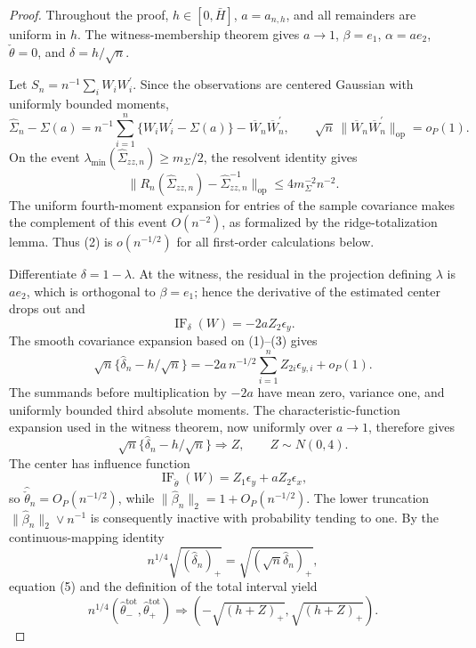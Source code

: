 \documentclass{article}
\begin{document}
\begin{proof}
Throughout the proof, \(h\in[0,\bar H]\), \(a=a_{n,h}\), and all remainders are uniform in \(h\). The witness-membership theorem gives \(a\to1\), \(\beta=e_1\), \(\alpha=ae_2\), \(\check\theta=0\), and \(\delta=h/\sqrt n\).

Let \(S_n=n^{-1}\sum_iW_iW_i^{\prime}\). Since the observations are centered Gaussian with uniformly bounded moments,
\[
 \widehat\Sigma_n-\Sigma(a)
 =n^{-1}\sum_{i=1}^n\{W_iW_i^{\prime}-\Sigma(a)\}
 -\overline W_n\overline W_n^{\prime},
 \qquad
 \sqrt n\,\|\overline W_n\overline W_n^{\prime}\|_{\mathrm{op}}
 =o_P(1). \tag{1}
\]
On the event \(\lambda_{\min}(\widehat\Sigma_{zz,n})\geq m_\Sigma/2\), the resolvent identity gives
\[
 \|R_n(\widehat\Sigma_{zz,n})-
 \widehat\Sigma_{zz,n}^{-1}\|_{\mathrm{op}}
 \leq4m_\Sigma^{-2}n^{-2}. \tag{2}
\]
The uniform fourth-moment expansion for entries of the sample covariance makes the complement of this event \(O(n^{-2})\), as formalized by the ridge-totalization lemma. Thus (2) is \(o(n^{-1/2})\) for all first-order calculations below.

Differentiate \(\delta=1-\lambda\). At the witness, the residual in the projection defining \(\lambda\) is \(ae_2\), which is orthogonal to \(\beta=e_1\); hence the derivative of the estimated center drops out and
\[
 \operatorname{IF}_{\delta}(W)=-2aZ_2\epsilon_y. \tag{3}
\]
The smooth covariance expansion based on (1)--(3) gives
\[
 \sqrt n\{\widehat\delta_n-h/\sqrt n\}
 =-2a\,n^{-1/2}\sum_{i=1}^nZ_{2i}\epsilon_{y,i}+o_P(1). \tag{4}
\]
The summands before multiplication by \(-2a\) have mean zero, variance one, and uniformly bounded third absolute moments. The characteristic-function expansion used in the witness theorem, now uniformly over \(a\to1\), therefore gives
\[
 \sqrt n\{\widehat\delta_n-h/\sqrt n\}\Rightarrow Z,
 \qquad Z\sim N(0,4). \tag{5}
\]
The center has influence function
\[
 \operatorname{IF}_{\check\theta}(W)
 =Z_1\epsilon_y+aZ_2\epsilon_x,
\]
so \(\widehat{\check\theta}_n=O_P(n^{-1/2})\), while \(\|\widehat\beta_n\|_2=1+O_P(n^{-1/2})\). The lower truncation \(\|\widehat\beta_n\|_2\vee n^{-1}\) is consequently inactive with probability tending to one. By the continuous-mapping identity
\[
 n^{1/4}\sqrt{(\widehat\delta_n)_+}
 =\sqrt{(\sqrt n\widehat\delta_n)_+},
\]
equation (5) and the definition of the total interval yield
\[
 n^{1/4}(\widehat\theta_-^{\mathrm{tot}},
 \widehat\theta_+^{\mathrm{tot}})
 \Rightarrow
 \left(-\sqrt{(h+Z)_+},\sqrt{(h+Z)_+}\right). \tag{6}
\]


\end{proof}
\end{document}
